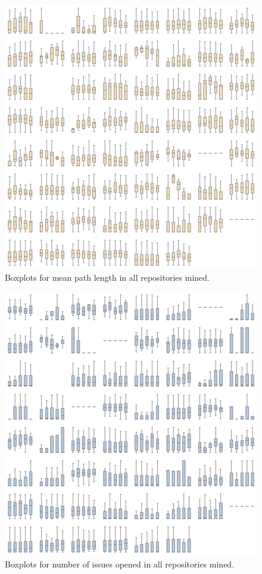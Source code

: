 \begin{appendices}
    \begin{figure}[!htb]
        \centering
        \includegraphics[width=\textwidth]{figures/quantitative/boxplots/grids/mean_path.png}
        \caption{Boxplots for mean path length in all repositories mined.}
        \label{app:mean_path-box-app}
    \end{figure}

    \begin{figure}[!htb]
        \centering
        \includegraphics[width=\textwidth]{figures/quantitative/boxplots/grids/issues_opened.png}
        \caption{Boxplots for number of issues opened in all repositories mined.}
        \label{app:issues_opened-box-app}
    \end{figure}


\end{appendices}
